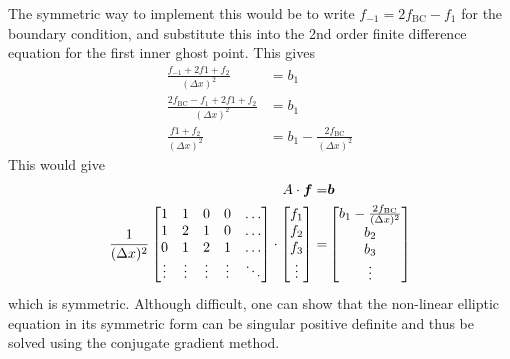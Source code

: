 The symmetric way to implement this would be to write
$f_{-1}=2f_{\text{BC}}-f_{1}$ for the boundary condition, and substitute this
into the 2nd order finite difference equation for the first inner ghost point.
This gives
%
\begin{align*}
    \frac{f_{-1}+2f{1}+f_{2}}{(\Delta x)^2}&=b_1\\
    \frac{2f_{\text{BC}}-f_{1}+2f{1}+f_{2}}{(\Delta x)^2}&=b_1\\
    \frac{f{1}+f_{2}}{(\Delta x)^2}&=b_1 - \frac{2f_{\text{BC}}}{(\Delta x)^2}
\end{align*}
%
This would give
%
\begin{align*}
    A\cdot\boldsymbol{f}=&\boldsymbol{b}\\
    \frac{1}{(\Delta x)^2}
    \begin{bmatrix}
        1                       & 1                       & 0 & 0 & \ldots\\
        1                       & 2                       & 1 & 0 & \ldots\\
        0                       & 1                       & 2 & 1 & \ldots\\
        \vdots                  & \vdots              &\vdots&\vdots&\ddots\\
    \end{bmatrix}
    \cdot
    \begin{bmatrix}
        f_{1}\\
        f_{2}\\
        f_{3}\\
        \vdots
    \end{bmatrix}
    =&
    \begin{bmatrix}
        b_{1} - \frac{2f_{\text{BC}}}{(\Delta x)^2}\\
        b_{2}\\
        b_{3}\\
        \vdots
    \end{bmatrix}
\end{align*}
%
which is symmetric. Although difficult, one can show that the non-linear
elliptic equation in its symmetric form can be singular positive definite and
thus be solved using the conjugate gradient method.

